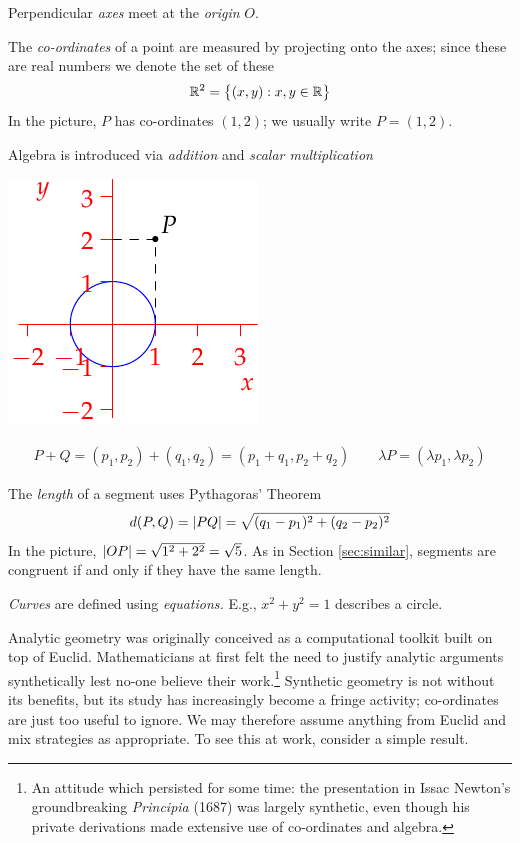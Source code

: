 \begin{itemize}\itemsep2pt
  \begin{minipage}[t]{0.72\linewidth}\vspace{-5pt}
  	\item Perpendicular \emph{axes} meet at the \emph{origin} $O$.
  	\item The \emph{co-ordinates} of a point are measured by projecting onto the axes; since these are real numbers we denote the set of these
  	\[
  		\mathbb{R}^2=\bigl\{(x,y):x,y\in\mathbb{R}\bigr\}
  	\]
  	In the picture, $P$ has co-ordinates $(1,2)$; we usually write $P=(1,2)$.
  	\item Algebra is introduced via \emph{addition} and \emph{scalar multiplication}
	\end{minipage}
	\hfill
	\begin{minipage}[t]{0.27\linewidth}\vspace{-5pt}
		\flushright\includegraphics{analytic-axes}
	\end{minipage}\par\vspace{-15pt}
  \begin{gather*}
  	P+Q =(p_1,p_2)+(q_1,q_2) =(p_1+q_1,p_2+q_2)\qquad
  	\lambda P=(\lambda p_1,\lambda p_2)
  \end{gather*}
  \item The \emph{length} of a segment uses Pythagoras' Theorem%
  \[
  	d(P,Q) =\left| PQ\right| =\sqrt{(q_1-p_1)^2+(q_2-p_2)^2}
  \]
  In the picture, $\left| OP\right|=\sqrt{1^2+2^2}=\sqrt 5$. As in Section \ref{sec:similar}, segments are congruent if and only if they have the same length.

  \item \emph{Curves} are defined using \emph{equations.} E.g., $x^2+y^2=1$ describes a circle. 
\end{itemize}

Analytic geometry was originally conceived as a computational toolkit built on top of Euclid. Mathematicians at first felt the need to justify analytic arguments synthetically lest no-one believe their work.\footnote{%
	An attitude which persisted for some time: the presentation in Issac Newton's groundbreaking \emph{Principia} (1687) was largely synthetic, even though his private derivations made extensive use of co-ordinates and algebra.%
} Synthetic geometry is not without its benefits, but its study has increasingly become a fringe activity; co-ordinates are just too useful to ignore. We may therefore assume anything from Euclid and mix strategies as appropriate. To see this at work, consider a simple result.

